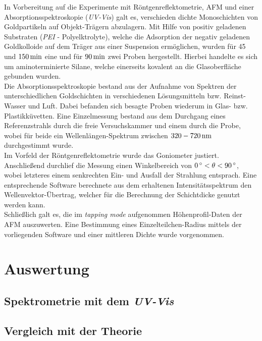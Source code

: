 \documentclass[numbers=noenddot,a4paper,notitlepage,twoside,BCOR15mm]{scrartcl}
\newcommand{\degree}{^\circ}
\newcommand{\tilt}[1]{\textit{#1}}
\begin{document}
		In Vorbereitung auf die Experimente mit Röntgenreflektometrie, AFM und einer Absorptionsspektroskopie (\tilt{UV-Vis}) galt es, verschieden dichte Monoschichten von Goldpartikeln auf Objekt-Trägern abzulagern. Mit Hilfe von positiv geladenen Substraten  (\tilt{PEI} - Polyelktrolyte), welche die Adsorption der negativ geladenen Goldkolloide auf dem Träger aus einer Suspension ermöglichen, wurden für 45 und $\unit[150]{min}$ eine und für $\unit[90]{min}$ zwei Proben hergestellt. Hierbei handelte es sich um aminoterminierte Silane, welche einerseits kovalent an die Glasoberfläche gebunden wurden.\\
		Die Absorptionsspektroskopie bestand aus der Aufnahme von Spektren der unterschiedlichen Goldschichten in verschiedenen Lösungsmitteln bzw. Reinst-Wasser und Luft. Dabei befanden sich besagte Proben wiederum in Glas- bzw. Plastikküvetten. Eine Einzelmessung bestand aus dem Durchgang eines Referenzstrahls durch die freie Versuchskammer und einem durch die Probe, wobei für beide ein Wellenlängen-Spektrum zwischen $\unit[320-720]{nm}$ durchgestimmt wurde.\\
		Im Vorfeld der Röntgenreflektometrie wurde das Goniometer justiert. Anschließend durchlief die Messung einen Winkelbereich von $\unit[0]{\degree}<\theta<\unit[90]{\degree}$, wobei  letzteres einem senkrechten Ein- und Ausfall der Strahlung entsprach. Eine entsprechende Software berechnete aus dem erhaltenen Intensitätsspektrum den Wellenvektor-Übertrag, welcher für die Berechnung der Schichtdicke genutzt werden kann.\\
		Schließlich galt es, die im \tilt{tapping mode} aufgenommen Höhenprofil-Daten der AFM auszuwerten. Eine Bestimmung eines Einzelteilchen-Radius mittels der vorliegenden Software und einer mittleren Dichte wurde vorgenommen.

	\newpage
	\section{Auswertung}\label{sec:auswertung}

		\subsection{Spektrometrie mit dem \tilt{UV-Vis}}\label{subsec:uvvis}

			\subsection*{Vergleich mit der Theorie}
\end{document}
